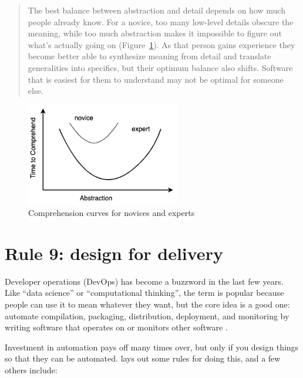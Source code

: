 \documentclass[10pt,letterpaper]{article}
\begin{document}
\begin{quotation}
  The best balance between abstraction and detail
  depends on how much people already know.
  For a novice,
  too many low-level details obscure the meaning,
  while too much abstraction makes it impossible to figure out what's actually going on
  (Figure~\ref{comprehension}).
  As that person gains experience
  they become better able to synthesize meaning from detail
  and translate generalities into specifics,
  but their optimum balance also shifts.
  Software that is easiest for them to understand may not be optimal for someone else.
\end{quotation}

\begin{figure}
  \centering
  \includegraphics[width=0.6\textwidth]{comprehension.png}
  \caption{Comprehension curves for novices and experts}
  \label{comprehension}
\end{figure}

\section*{Rule 9: design for delivery}

Developer operations (DevOps) has become a buzzword in the last few years.
Like ``data science'' or ``computational thinking'',
the term is popular because people can use it to mean whatever they want,
but the core idea is a good one:
automate compilation, packaging, distribution, deployment, and monitoring
by writing software that operates on or monitors other software \cite{Kim2016,Forsgren2018}.

Investment in automation pays off many times over,
but only if you design things so that they can be automated.
\cite{Taschuk2017} lays out some rules for doing this,
and a few others include:
\end{document}
